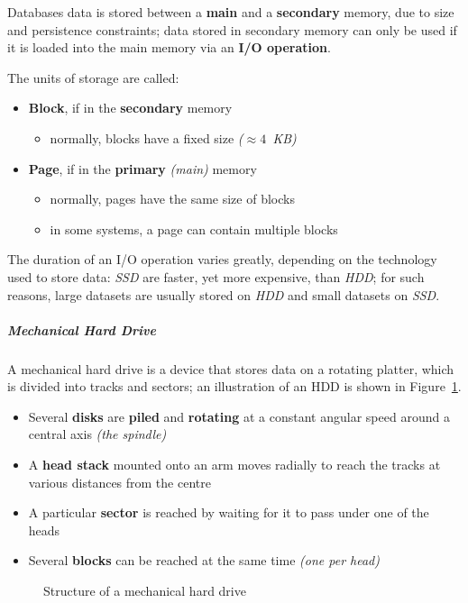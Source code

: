 \documentclass[english]{article}
\begin{document}
Databases data is stored between a \textbf{main} and a \textbf{secondary} memory, due to size and persistence constraints;
data stored in secondary memory can only be used if it is loaded into the main memory via an \textbf{I/O operation}.

The units of storage are called:
\begin{itemize}
  \item \textbf{Block}, if in the \textbf{secondary} memory
        \begin{itemize}
          \item normally, blocks have a fixed size \textit{(\(\approx 4\,\) KB)}
        \end{itemize}
  \item \textbf{Page}, if in the \textbf{primary} \textit{(main)} memory
        \begin{itemize}
          \item normally, pages have the same size of blocks
          \item in some systems, a page can contain multiple blocks
        \end{itemize}
\end{itemize}

The duration of an I/O operation varies greatly, depending on the technology used to store data:
\textit{SSD} are faster, yet more expensive, than \textit{HDD};
for such reasons, large datasets are usually stored on \textit{HDD} and small datasets on \textit{SSD}.

\subparagraph*{Mechanical Hard Drive}
A mechanical hard drive is a device that stores data on a rotating platter, which is divided into tracks and sectors;
an illustration of an HDD is shown in Figure~\ref{figure:hdd-structure}.

\begin{itemize}
  \item Several \textbf{disks} are \textbf{piled} and \textbf{rotating} at a constant angular speed around a central axis \textit{(the spindle)}
  \item A \textbf{head stack} mounted onto an arm moves radially to reach the tracks at various distances from the centre
  \item A particular \textbf{sector} is reached by waiting for it to pass under one of the heads
  \item Several \textbf{blocks} can be reached at the same time \textit{(one per head)}
\end{itemize}

\begin{figure}[htbp]
  \centering
  \bigskip
  \caption{Structure of a mechanical hard drive}
  \label{figure:hdd-structure}
  \bigskip
\end{figure}
\end{document}
